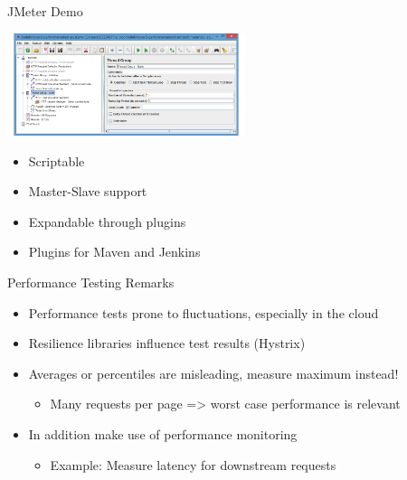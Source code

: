 \begin{frame}[fragile]{JMeter Demo}
	\centerline{
		\includegraphics[height=30mm]{../TestStrategy/images/JMeter}
	}
	\begin{itemize}
		\item Scriptable
		\item Master-Slave support
		\item Expandable through plugins
		\item Plugins for Maven and Jenkins
	\end{itemize}
	\vfill
\end{frame}

\begin{frame}[fragile]{Performance Testing Remarks}
	\begin{itemize}
		\item Performance tests prone to fluctuations, especially in the cloud
		\item Resilience libraries influence test results (Hystrix) 
		\item Averages or percentiles are misleading, measure maximum instead!
			\begin{itemize}		
				\item Many requests per page => worst case performance is relevant 
			\end{itemize}
		\item In addition make use of performance monitoring
		\begin{itemize}		
			\item Example: Measure latency for downstream requests
		\end{itemize}	
	\end{itemize}
\end{frame}

